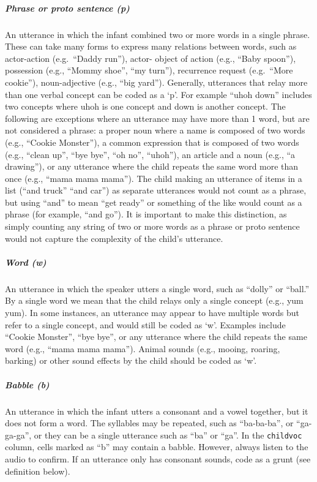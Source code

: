 \documentclass[
  12pt,
]{book}
\begin{document}
\hypertarget{phrase_proto_sentence}{%
\subparagraph*{Phrase or proto sentence (p)}\label{phrase_proto_sentence}}

An utterance in which the infant combined two or more words in a single phrase. These can take many forms to express many relations between words, such as actor-action (e.g.~``Daddy run''), actor- object of action (e.g., ``Baby spoon''), possession (e.g., ``Mommy shoe'', ``my turn''), recurrence request (e.g.~``More cookie''), noun-adjective (e.g., ``big yard''). Generally, utterances that relay more than one verbal concept can be coded as a `p'. For example ``uhoh down'' includes two concepts where uhoh is one concept and down is another concept.
The following are exceptions where an utterance may have more than 1 word, but are not considered a phrase: a proper noun where a name is composed of two words (e.g., ``Cookie Monster''), a common expression that is composed of two words (e.g., ``clean up'', ``bye bye'', ``oh no'', ``uhoh''), an article and a noun (e.g., ``a drawing''), or any utterance where the child repeats the same word more than once (e.g., ``mama mama mama''). The child making an utterance of items in a list (``and truck'' ``and car'') as separate utterances would not count as a phrase, but using ``and'' to mean ``get ready'' or something of the like would count as a phrase (for example, ``and go''). It is important to make this distinction, as simply counting any string of two or more words as a phrase or proto sentence would not capture the complexity of the child's utterance.

\hypertarget{word}{%
\subparagraph*{Word (w)}\label{word}}

An utterance in which the speaker utters a single word, such as ``dolly'' or ``ball.'' By a single word we mean that the child relays only a single concept (e.g., yum yum).
In some instances, an utterance may appear to have multiple words but refer to a single concept, and would still be coded as `w'. Examples include ``Cookie Monster'', ``bye bye'', or any utterance where the child repeats the same word (e.g., ``mama mama mama''). Animal sounds (e.g., mooing, roaring, barking) or other sound effects by the child should be coded as `w'.

\hypertarget{babble}{%
\subparagraph*{Babble (b)}\label{babble}}

An utterance in which the infant utters a consonant and a vowel together, but it does not form a word. The syllables may be repeated, such as ``ba-ba-ba'', or ``ga-ga-ga'', or they can be a single utterance such as ``ba'' or ``ga''. In the \texttt{childvoc} column, cells marked as ``b'' may contain a babble. However, always listen to the audio to confirm.
If an utterance only has consonant sounds, code as a grunt (see definition below).
\end{document}
